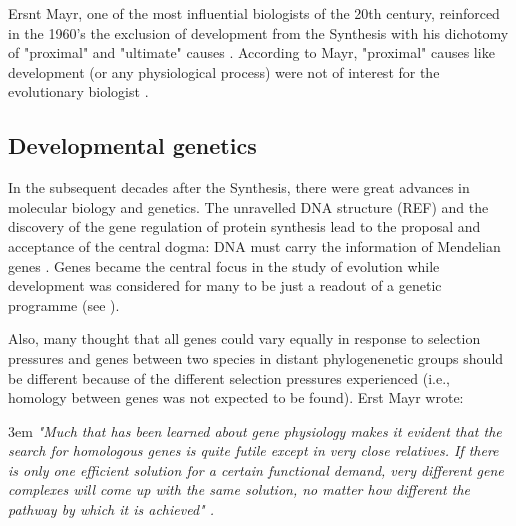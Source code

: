 Ersnt Mayr, one of the most influential biologists of the 20th century, reinforced in the 1960's the exclusion of development from the Synthesis with his dichotomy of "proximal" and "ultimate" causes \citep{Mayr1961}.
According to Mayr, "proximal" causes like development (or any physiological process) were not of interest for the evolutionary biologist \citep{Mayr1961,Mayr1993}.


\subsection{Developmental genetics}

In the subsequent decades after the Synthesis, there were great advances in molecular biology and genetics. The unravelled DNA structure (REF) and the discovery of the gene regulation of protein synthesis \citep{Jacob1961} lead to the proposal and acceptance of the central dogma: DNA must carry the information of Mendelian genes \citep{Crick1958,Crick1970}. 
Genes became the central focus in the study of evolution while development was considered for many to be just a readout of a genetic programme (see \citealp{foxkeller2000geneprogram}).

Also, many thought that all genes could vary equally in response to selection pressures and genes between two species in distant phylogenenetic groups should be different because of the different selection pressures experienced (i.e., homology between genes was not expected to be found). Erst Mayr wrote: 


\begin{flushleft}
\leftskip3em
\rightskip\leftskip
\footnotesize{
\textit{
"Much that has been learned about gene physiology makes it evident that the search for homologous genes is quite futile except in very close relatives. If there is only one efficient solution for a certain functional demand, very different gene complexes will come up with the same solution, no matter how different the pathway by which it is achieved" \citep{Mayr1966}.}}
\end{flushleft}

